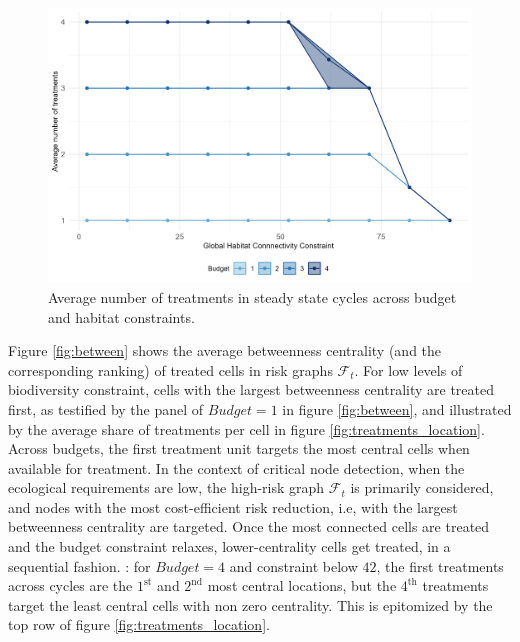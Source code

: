 \begin{figure}
     \centering
         \includegraphics[width=.8\textwidth]{figures/wildland/number_treatments.jpg}
         \caption{Average number of treatments in steady state cycles across budget and habitat constraints.}
         \label{fig:treatments_number}
\end{figure}


Figure \ref{fig:between} shows the average betweenness centrality (and the corresponding ranking) of treated cells in risk graphs $\mathcal{F}_t$. For low levels of biodiversity constraint, cells with the largest betweenness centrality are treated first, as testified by the panel of $Budget=1$ in figure \ref{fig:between}, and illustrated by the average share of treatments per cell in figure \ref{fig:treatments_location}. Across budgets, the first treatment unit targets the most central cells when available for treatment. In the context of critical node detection, when the ecological requirements are low, the high-risk graph $\mathcal{F}_t$ is primarily considered, and nodes with the most cost-efficient risk reduction, i.e, with the largest betweenness centrality are targeted. Once the most connected cells are treated and the budget constraint relaxes, lower-centrality cells get treated, in a sequential fashion. : for $Budget=4$ and constraint below $42$, the first treatments across cycles are the $1^{\mathrm{st}}$ and $2^{\mathrm{nd}}$ most central locations, but the $4^{\mathrm{th}}$ treatments target the least central cells with non zero centrality. This is epitomized by the top row of figure \ref{fig:treatments_location}.  

